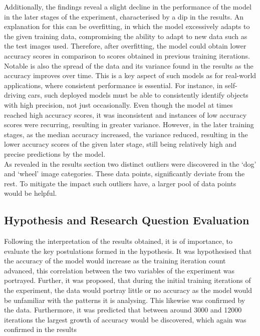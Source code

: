 Additionally, the findings reveal a slight decline in the performance of the model in the later stages of the experiment, characterised by a dip in the results. An explanation for this can be overfitting, in which the model excessively adapts to the given training data, compromising the ability to adapt to new data such as the test images used. Therefore, after overfitting, the model could obtain lower accuracy scores in comparison to scores obtained in previous training iterations. \\

Notable is also the spread of the data and its variance found in the results as the accuracy improves over time. This is a key aspect of such models as for real-world applications, where consistent performance is essential. For instance, in self-driving cars, such deployed models must be able to consistently identify objects with high precision, not just occasionally. Even though the model at times reached high accuracy scores, it was inconsistent and instances of low accuracy scores were recurring, resulting in greater variance. However, in the later training stages,  as the median accuracy increased, the variance reduced, resulting in the lower accuracy scores of the given later stage, still being relatively high and precise predictions by the model.   \\

As revealed in the results section two distinct outliers were discovered in the ‘dog’ and ‘wheel’ image categories. These data points, significantly deviate from the rest. To mitigate the impact such outliers have, a larger pool of data points would be helpful. \\

\subsection{Hypothesis and Research Question Evaluation}
Following the interpretation of the results obtained, it is of importance, to evaluate the key postulations formed in the hypothesis. It was hypothesised that the accuracy of the model would increase as the training iteration count advanced, this correlation between the two variables of the experiment was portrayed. Further, it was proposed, that during the initial training iterations of the experiment, the data would portray little or no accuracy as the model would be unfamiliar with the patterns it is analysing. This likewise was confirmed by the data. Furthermore, it was predicted that between around 3000 and 12000 iterations the largest growth of accuracy would be discovered, which again was confirmed in the results\\


